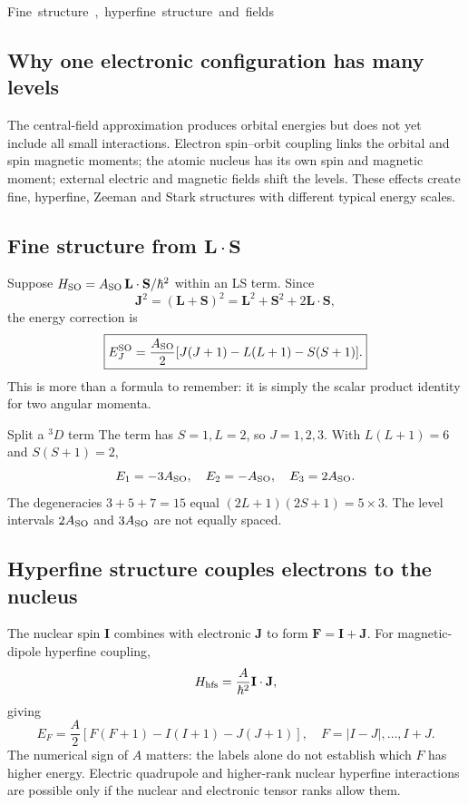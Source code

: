 \unit{Fine structure, hyperfine structure and fields}
\subsection{Why one electronic configuration has many levels}
The central-field approximation produces
orbital energies but does not yet include
all small interactions. Electron spin--orbit
coupling links the orbital and spin
magnetic moments; the atomic nucleus has
its own spin and magnetic moment; external
electric and magnetic fields shift the levels.
These effects create fine, hyperfine,
Zeeman and Stark structures with
different typical energy scales.

\subsection{Fine structure from \(\mathbf L\cdot\mathbf S\)}
Suppose \(H_{\rm SO}=A_{\rm SO}\,
\mathbf L\cdot\mathbf S/\hbar^2\)
within an LS term. Since
\[
\mathbf J^2=(\mathbf L+\mathbf S)^2
=\mathbf L^2+\mathbf S^2+
2\mathbf L\cdot\mathbf S,
\]
the energy correction is
\[
\boxed{E_J^{\rm SO}=\frac{A_{\rm SO}}2
[J(J+1)-L(L+1)-S(S+1)].}
\]
This is more than a formula to remember:
it is simply the scalar product identity
for two angular momenta.

\begin{worked}{Split a \({}^3D\) term}
The term has \(S=1,L=2\), so
\(J=1,2,3\). With \(L(L+1)=6\) and
\(S(S+1)=2\),
\[
E_1=-3A_{\rm SO},\quad
E_2=-A_{\rm SO},\quad
E_3=2A_{\rm SO}.
\]
The degeneracies \(3+5+7=15\)
equal \((2L+1)(2S+1)=5\times3\).
The level intervals \(2A_{\rm SO}\)
and \(3A_{\rm SO}\) are not equally spaced.
\end{worked}

\subsection{Hyperfine structure couples electrons to the nucleus}
The nuclear spin \(\mathbf I\) combines
with electronic \(\mathbf J\) to form
\(\mathbf F=\mathbf I+\mathbf J\).
For magnetic-dipole hyperfine coupling,
\[
H_{\rm hfs}=\frac{A}{\hbar^2}\mathbf I\cdot\mathbf J,
\]
giving
\[
\boxed{E_F=\frac A2[
F(F+1)-I(I+1)-J(J+1)]},\quad
F=|I-J|,\ldots,I+J.
\]
The numerical sign of \(A\) matters:
the labels alone do not establish
which \(F\) has higher energy.
Electric quadrupole and higher-rank
nuclear hyperfine interactions are
possible only if the nuclear and
electronic tensor ranks allow them.

